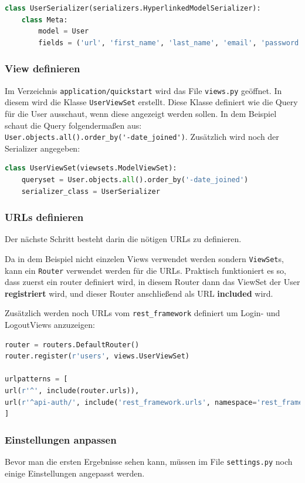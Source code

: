 \begin{lstlisting}[language=python]
class UserSerializer(serializers.HyperlinkedModelSerializer):
	class Meta:
		model = User
		fields = ('url', 'first_name', 'last_name', 'email', 'password')
\end{lstlisting}

\subsubsection{View definieren}
Im Verzeichnis \verb|application/quickstart| wird das File \verb|views.py| geöffnet. In diesem wird die Klasse \verb|UserViewSet| erstellt. Diese Klasse definiert wie die Query für die User ausschaut, wenn diese angezeigt werden sollen. In dem Beispiel schaut die Query folgendermaßen aus:\\
\verb|User.objects.all().order_by('-date_joined')|. Zusätzlich wird noch der Serializer angegeben:

\begin{lstlisting}[language=Python]
class UserViewSet(viewsets.ModelViewSet):
	queryset = User.objects.all().order_by('-date_joined')
	serializer_class = UserSerializer
\end{lstlisting}

\subsubsection{URLs definieren}
Der nächste Schritt besteht darin die nötigen URLs zu definieren.

Da in dem Beispiel nicht einzelen Views verwendet werden sondern \verb|ViewSet|s, kann ein \verb|Router| verwendet werden für die URLs. Praktisch funktioniert es so, dass zuerst ein router definiert wird, in diesem Router dann das ViewSet der User \textbf{registriert} wird, und dieser Router anschließend als URL \textbf{included} wird. 

Zusätzlich werden noch URLs vom \verb|rest_framework| definiert um Login- und LogoutViews anzuzeigen: 

\begin{lstlisting}[language=python]
router = routers.DefaultRouter()
router.register(r'users', views.UserViewSet)

urlpatterns = [
url(r'^', include(router.urls)),
url(r'^api-auth/', include('rest_framework.urls', namespace='rest_framework'))
]
\end{lstlisting} 

\subsubsection{Einstellungen anpassen}
Bevor man die ersten Ergebnisse sehen kann, müssen im File \verb|settings.py| noch einige Einstellungen angepasst werden.

